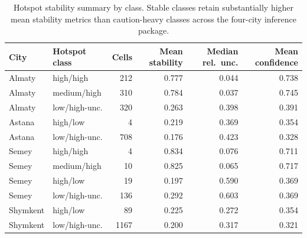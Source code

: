 \begin{table}[H]
\centering
\small
\caption{Hotspot stability summary by class. Stable classes retain substantially higher mean stability metrics than caution-heavy classes across the four-city inference package.}
\label{tab:hotspot-stability-unified}
\begin{tabular}{lp{2.8cm}rrrr}
\toprule
City & Hotspot class & Cells & Mean stability & Median rel.\ unc. & Mean confidence \\
\midrule
Almaty   & high/high      & 212  & 0.777 & 0.044 & 0.738 \\
Almaty   & medium/high    & 310  & 0.784 & 0.037 & 0.745 \\
Almaty   & low/high-unc.  & 320  & 0.263 & 0.398 & 0.391 \\
Astana   & high/low       & 4    & 0.219 & 0.369 & 0.354 \\
Astana   & low/high-unc.  & 708  & 0.176 & 0.423 & 0.328 \\
Semey    & high/high      & 4    & 0.834 & 0.076 & 0.711 \\
Semey    & medium/high    & 10   & 0.825 & 0.065 & 0.717 \\
Semey    & high/low       & 19   & 0.197 & 0.590 & 0.369 \\
Semey    & low/high-unc.  & 136  & 0.292 & 0.603 & 0.369 \\
Shymkent & high/low       & 89   & 0.225 & 0.272 & 0.354 \\
Shymkent & low/high-unc.  & 1167 & 0.200 & 0.317 & 0.321 \\
\bottomrule
\end{tabular}
\end{table}

